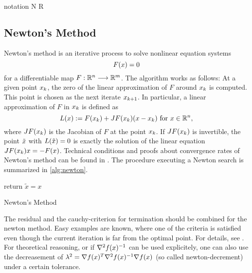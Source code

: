 \todo notation N R
\subsection{Newton's Method}
Newton's method is an iterative process to solve nonlinear equation systems
\begin{equation}
F(x)= 0
\end{equation}
for a differentiable map $ F: \mathbb{R}^n \longrightarrow \mathbb{R}^m $. The algorithm works as follows: At a given point $ x_k $, the zero of the linear approximation of $ F $ around $ x_k $  is computed. This point is chosen as the next iterate $ x_{k+1} $. In particular, a linear approximation of $ F $ in  $ x_k $ is defined as
\begin{equation}
L(x):= F(x_k) + J F (x_k)(x - x_k) \text{ for } x\in \mathbb{R}^n,
\end{equation}
where $ J F (x_k) $ is the Jacobian of $ F $ at the point $ x_k $. If $ J F (x_k) $ is invertible, the point $ \tilde{x} $ with $ L(\tilde{x})=0 $ is exactly the solution of  the linear equation $ J F (x_k) x = -F(x) $.
Technical conditions and proofs about convergence rates of Newton's method can be found in \cite{SO}.
The procedure executing a Newton search is summarized in \eqref{alg:newton}.

\begin{algorithm}
	\SetAlgoLined
	\BlankLine
	return $ \tilde{x} = x $\;
	\caption{Newton's Method}
	\label{alg:newton}
\end{algorithm}
\begin{remark}\label{re:newtonStop}
	The residual and the cauchy-criterion for termination should be combined for the newton method. Easy examples are known, where one of the criteria is satisfied even though the current iteration is far from the optimal point. For details, see \cite{SO}.
	For theoretical reasoning, or if $ \nabla^2 f(x)^{-1} $ can be used explicitely, one can also use the decreasement of $ \lambda^2 = \nabla f(x) ^T \nabla^2 f(x)^{-1} \nabla f(x)$ (so called newton-decrement) under a certain tolerance.
\end{remark}


